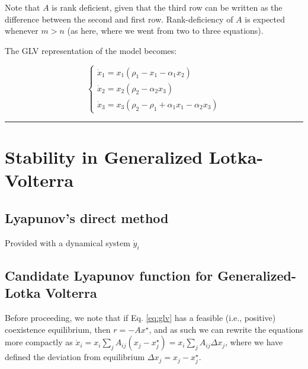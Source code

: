 \documentclass{article}
\begin{document}
Note that \(A\) is rank deficient, given that the third row can be
written as the difference between the second and first row.
Rank-deficiency of \(A\) is expected whenever \(m > n\) (as here, where
we went from two to three equations).

The GLV representation of the model becomes:

\begin{equation}
\label{eq:lgglv}
\begin{cases}
\dot{x}_1 = x_1 (\rho_1 - x_1 - \alpha_1 x_2)\\
\dot{x}_2 = x_2 (\rho_2 - \alpha_2 x_3)\\
\dot{x}_3 = x_3 (\rho_2 - \rho_1 + \alpha_1 x_1 - \alpha_2 x_3)
\end{cases}
\end{equation}

\begin{center}\rule{0.5\linewidth}{0.5pt}\end{center}

\hypertarget{stability-in-generalized-lotka-volterra}{%
\section{Stability in Generalized
Lotka-Volterra}\label{stability-in-generalized-lotka-volterra}}

\hypertarget{lyapunovs-direct-method}{%
\subsection{Lyapunov's direct method}\label{lyapunovs-direct-method}}

Provided with a dynamical system \(\dot{y}_i\)

\hypertarget{candidate-lyapunov-function-for-generalized-lotka-volterra}{%
\subsection{Candidate Lyapunov function for Generalized-Lotka
Volterra}\label{candidate-lyapunov-function-for-generalized-lotka-volterra}}

Before proceeding, we note that if Eq. \ref{eq:glv} has a feasible
(i.e., positive) coexistence equilibrium, then \(r = -A x^\star\), and
as such we can rewrite the equations more compactly as
\(\dot{x}_i = x_i \sum_{j} A_{ij} (x_j - x_j^\star) = x_i \sum_{j} A_{ij} \Delta x_j\),
where we have defined the deviation from equilibrium
\(\Delta x_j = x_j - x_j^\star\).
\end{document}
